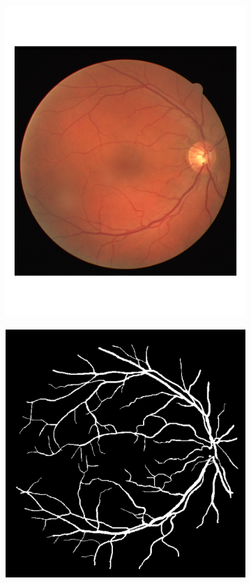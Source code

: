 \documentclass[12pt, notitlepage]{article}
\begin{document}
\begin{figure}[H]
\centering
\begin{subfigure}{0.4\columnwidth}
\includegraphics[width=\columnwidth]{figures/20_test}
\caption{}
\label{fig:}
\end{subfigure}
\begin{subfigure}{0.4\columnwidth}
\includegraphics[width=\columnwidth]{figures/20_manual1}

\end{subfigure}
\end{figure}
\end{document}

